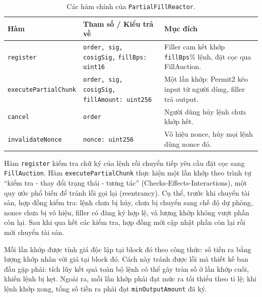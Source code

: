 \documentclass[../DoAn.tex]{subfiles}
\begin{document}
\begin{table}[H]
    \centering
    \caption{Các hàm chính của \texttt{PartialFillReactor}.}
    \label{table:pfr_methods}
    \begin{tabular}{|p{4cm}|p{4.5cm}|p{5.5cm}|}
        \hline
        \textbf{Hàm} & \textbf{Tham số / Kiểu trả về} & \textbf{Mục đích} \\
        \hline
        \texttt{register} &
            \texttt{order, sig, cosigSig,} \newline \texttt{fillBps: uint16} &
            Filler cam kết khớp \texttt{fillBps}\% lệnh, đặt cọc qua FillAuction. \\
        \hline
        \texttt{execute}\newline\texttt{PartialChunk} &
            \texttt{order, sig, cosigSig,} \newline \texttt{fillAmount: uint256} &
            Một lần khớp: Permit2 kéo input từ người dùng, filler trả output. \\
        \hline
        \texttt{cancel} &
            \texttt{order} &
            Người dùng hủy lệnh chưa khớp hết. \\
        \hline
        \texttt{invalidateNonce} &
            \texttt{nonce: uint256} &
            Vô hiệu nonce, hủy mọi lệnh dùng nonce đó. \\
        \hline
    \end{tabular}
\end{table}

Hàm \texttt{register} kiểm tra chữ ký của lệnh rồi chuyển tiếp yêu cầu đặt cọc sang \texttt{FillAuction}. Hàm \texttt{executePartialChunk} thực hiện một lần khớp theo trình tự ``kiểm tra - thay đổi trạng thái - tương tác'' (Checks-Effects-Interactions), một quy ước phổ biến để tránh lỗi gọi lại (reentrancy). Cụ thể, trước khi chuyển tài sản, hợp đồng kiểm tra: lệnh chưa bị hủy, chưa bị chuyển sang chế độ dự phòng, nonce chưa bị vô hiệu, filler có đăng ký hợp lệ, và lượng khớp không vượt phần còn lại. Sau khi qua hết các kiểm tra, hợp đồng mới cập nhật phần còn lại rồi mới chuyển tài sản.

Mỗi lần khớp được tính giá độc lập tại block đó theo công thức: số tiền ra bằng lượng khớp nhân với giá tại block đó. Cách này tránh được lỗi mà thiết kế ban đầu gặp phải: tích lũy kết quả toàn bộ lệnh có thể gây tràn số ở lần khớp cuối, khiến lệnh bị kẹt. Ngoài ra, mỗi lần khớp phải đạt mức ra tối thiểu theo tỉ lệ; khi lệnh khớp xong, tổng số tiền ra phải đạt \texttt{minOutputAmount} đã ký.
\end{document}
